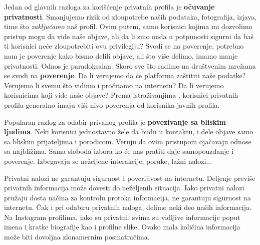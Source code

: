 \documentclass[12pt, a4paper]{article}
\begin{document}
{Jedan od glavnih razloga za korišćenje privatnih profila je \textbf{očuvanje privatnosti}. 
Smanjujemo rizik od zloupotrebe naših podataka, fotografija, izjava, time što \textit{zaključamo} naš profil. 
Ovim putem, samo korisnici kojima mi dozvolimo pristup mogu da vide naše objave, ali da li smo onda u potpunosti sigurni da baš ti korisnici neće zloupotrebiti ovu privilegiju? Svodi se na poverenje, potrebno nam je poverenje kako bismo delili objave, ali što više delimo, imamo manje privatnosti. Odnos je paradoksalan.
Skoro sve što radimo na društvenim mrežama se svodi na \textbf{poverenje}. Da li verujemo da će platforma zaštititi naše podatke? Verujemo li svemu što vidimo i pročitamo na internetu? Da li verujemo korisnicima koji vide naše objave?
Prema istraživanjima \cite{cyberology}, korisnici privatnih profila generalno imaju viši nivo poverenja od korisnika javnih profila.

Popularan razlog za odabir privanog profila je \textbf{povezivanje sa bliskim ljudima}. Neki korisnici jednostavno žele da budu u kontaktu, i dele objave samo sa bliskim prijateljima i porodicom. Veruju da ovim pristupom ojačavaju odnose sa najbližima. Sama sloboda izbora ko će nas pratiti daje samopouzdanje i poverenje. Izbegavaju se neželjene interakcije, poruke, lažni nalozi...

Privatni nalozi ne garantuju sigurnost i poverljivost na internetu. Deljenje previše privatnih informacija može dovesti do neželjenih situacija. Iako privatni nalozi pružaju dosta načina za kontrolu protoka informacija, ne garantuju sigurnost na internetu. Čak i pri odabiru privatnih naloga, delimo neki deo naših informacija.
Na Instagram profilima, iako su privatni, svima su vidljive informacije poput imena i kratke biografije kao i profilne slike. Ovako mala količina informacija može biti dovoljna zlonamernim posmatračima.


}
\end{document}
